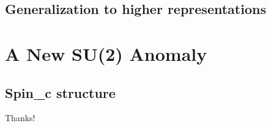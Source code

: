 \documentclass[10pt,aspectratio=43,xcolor=x11names]{beamer}%
\begin{document}
	\subsection{Generalization to higher representations}
		

\section{A New SU(2) Anomaly}
	\subsection{Spin_c structure}

\fi
\begin{frame}
\centerline{{\fontsize{50}{60}\selectfont Thanks!}}
\end{frame}
\end{document}
